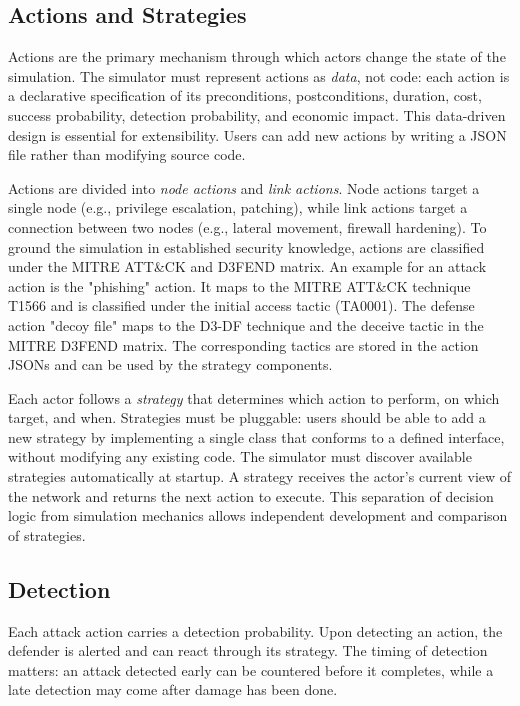 \documentclass{llncs}
\begin{document}
\subsection{Actions and Strategies}
Actions are the primary mechanism through which actors change the state of the simulation. The simulator must represent actions as \emph{data}, not code: each action is a declarative specification of its preconditions, postconditions, duration, cost, success probability, detection probability, and economic impact. This data-driven design is essential for extensibility. Users can add new actions by writing a JSON file rather than modifying source code.

Actions are divided into \emph{node actions} and \emph{link actions}. Node actions target a single node (e.g., privilege escalation, patching), while link actions target a connection between two nodes (e.g., lateral movement, firewall hardening). To ground the simulation in established security knowledge, actions are classified under the MITRE ATT\&CK and D3FEND matrix. An example for an attack action is the "phishing" action. It maps to the MITRE ATT\&CK technique T1566 and is classified under the initial access tactic (TA0001). The defense action "decoy file" maps to the D3-DF technique and the deceive tactic in the MITRE D3FEND matrix. The corresponding tactics are stored in the action JSONs and can be used by the strategy components.

Each actor follows a \emph{strategy} that determines which action to perform, on which target, and when. Strategies must be pluggable: users should be able to add a new strategy by implementing a single class that conforms to a defined interface, without modifying any existing code. The simulator must discover available strategies automatically at startup. A strategy receives the actor's current view of the network and returns the next action to execute. This separation of decision logic from simulation mechanics allows independent development and comparison of strategies.

\subsection{Detection}
Each attack action carries a detection probability. Upon detecting an action, the defender is alerted and can react through its strategy. The timing of detection matters: an attack detected early can be countered before it completes, while a late detection may come after damage has been done.
\end{document}
